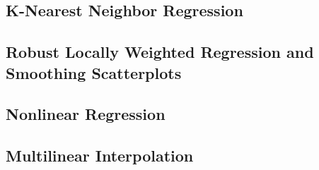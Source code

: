 \subsection{K-Nearest Neighbor Regression}
      
\subsection{Robust Locally Weighted Regression and Smoothing Scatterplots}
   \cite{cleveland1979robust}\cite{cleveland1988locally}

\subsection{Nonlinear Regression}
   \cite{gallant1975nonlinear}

\subsection{Multilinear Interpolation}
   \cite{davies1997multidimensional}

